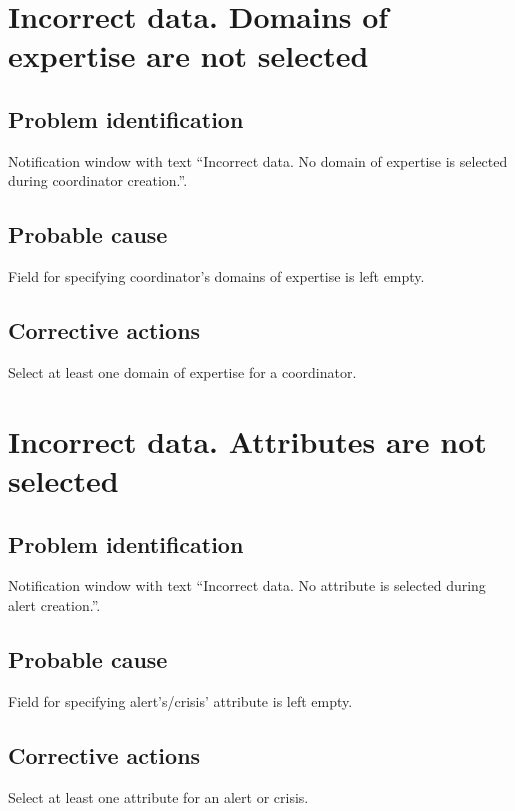 \section{Incorrect data. Domains of expertise are not selected}

\subsection{Problem identification}
Notification window with text ``Incorrect data. No domain of expertise is
selected during coordinator creation.''.

\subsection{Probable cause}
Field for specifying coordinator’s domains of expertise is left empty.

\subsection{Corrective actions}
Select at least one domain of expertise for a coordinator.

\section{Incorrect data. Attributes are not selected}

\subsection{Problem identification}
Notification window with text ``Incorrect data. No attribute is selected during
alert creation.''.

\subsection{Probable cause}
Field for specifying alert's/crisis' attribute is left empty.

\subsection{Corrective actions}
Select at least one attribute for an alert or crisis.